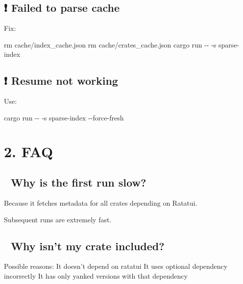 \documentclass[
  letterpaper,
  DIV=11,
  numbers=noendperiod]{scrreprt}
\newenvironment{Shaded}{\begin{snugshade}}{\end{snugshade}}
\newcommand{\AttributeTok}[1]{\textcolor[rgb]{0.40,0.45,0.13}{#1}}
\newcommand{\ExtensionTok}[1]{\textcolor[rgb]{0.00,0.23,0.31}{#1}}
\newcommand{\FunctionTok}[1]{\textcolor[rgb]{0.28,0.35,0.67}{#1}}
\newcommand{\NormalTok}[1]{\textcolor[rgb]{0.00,0.23,0.31}{#1}}
\begin{document}
\subsection{❗ Failed to parse cache}\label{failed-to-parse-cache}

Fix:

\begin{Shaded}
\begin{Highlighting}[]
\FunctionTok{rm}\NormalTok{ cache/index\_cache.json}
\FunctionTok{rm}\NormalTok{ cache/crates\_cache.json}
\ExtensionTok{cargo}\NormalTok{ run }\AttributeTok{{-}{-}} \AttributeTok{{-}s}\NormalTok{ sparse{-}index}
\end{Highlighting}
\end{Shaded}

\subsection{❗ Resume not working}\label{resume-not-working}

Use:

\begin{Shaded}
\begin{Highlighting}[]
\ExtensionTok{cargo}\NormalTok{ run }\AttributeTok{{-}{-}} \AttributeTok{{-}s}\NormalTok{ sparse{-}index }\AttributeTok{{-}{-}force{-}fresh}
\end{Highlighting}
\end{Shaded}

\section{2. FAQ}\label{faq}

\subsection{💬 Why is the first run
slow?}\label{why-is-the-first-run-slow}

Because it fetches metadata for all crates depending on Ratatui.

Subsequent runs are extremely fast.

\subsection{💬 Why isn't my crate
included?}\label{why-isnt-my-crate-included}

Possible reasons: It doesn't depend on ratatui It uses optional
dependency incorrectly It has only yanked versions with that dependency
\end{document}
